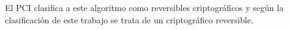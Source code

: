 


%
%
%

El PCI clasifica a este algoritmo como reversibles criptográficos y según la
clasificación de este trabajo se trata de un criptográfico reversible.

